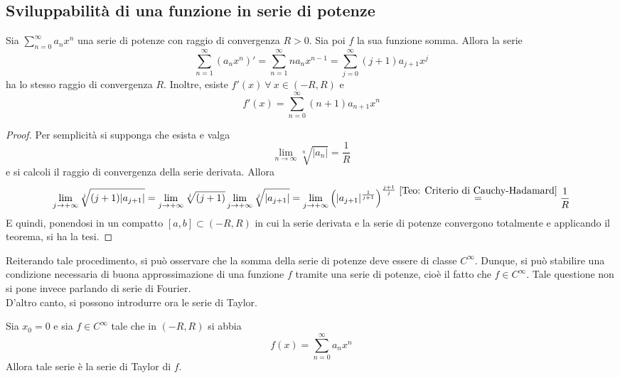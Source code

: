 \subsection{Sviluppabilità di una funzione in serie di potenze}
\begin{theorem} \label{Teo: Derivazione di serie di potenze}
Sia $\sum\limits_{n=0}^{\infty}{a_n x^n}$ una serie di potenze con raggio di convergenza $R>0$. Sia poi $f$ la sua funzione somma. Allora la serie
\begin{equation*}
    \sum\limits_{n=1}^{\infty}{\left(a_n x^n\right)'}= \sum\limits_{n=1}^{\infty}{n a_n x^{n-1}}= \sum\limits_{j=0}^{\infty}{\left(j+1\right)a_{j+1} x^j}
\end{equation*}
ha lo stesso raggio di convergenza $R$. Inoltre, esiste $f'(x)\ \forall\ x \in (-R, R)$ e
\begin{equation*}
    f'(x)=\sum\limits_{n=0}^{\infty}{\left(n+1\right)a_{n+1} x^n}
\end{equation*}
\end{theorem}
\begin{proof}
    Per semplicità si supponga che esista e valga 
    \begin{equation*}
        \lim_{n \to \infty}{\sqrt[n]{|a_n|}}=\frac{1}{R}
    \end{equation*}
    e si calcoli il raggio di convergenza della serie derivata. Allora
    \begin{equation*}
        \lim_{j \to + \infty}{\sqrt[j]{(j+1)|a_{j+1}|}} = \lim_{j \to + \infty}{\sqrt[j]{(j+1)}} \lim_{j \to + \infty}{\sqrt[j]{|a_{j+1}|}}= \lim_{j \to + \infty}{{\left(|a_{j+1}|^{\frac{1}{j+1}}\right)^{\frac{j+1}{j}}}}  \overset{\ref{Teo: Criterio di Cauchy-Hadamard}}{=} \frac{1}{R}
    \end{equation*}
    E quindi, ponendosi in un compatto $[a,b] \subset (-R, R)$ in cui la serie derivata e la serie di potenze convergono totalmente e applicando il teorema, si ha la tesi.
\end{proof}
Reiterando tale procedimento, si può osservare che la somma della serie di potenze deve essere di classe $C^\infty$. Dunque, si può stabilire una condizione necessaria di buona approssimazione di una funzione $f$ tramite una serie di potenze, cioè il fatto che $f \in C^{\infty}$. Tale questione non si pone invece parlando di serie di Fourier.\\
D'altro canto, si possono introdurre ora le serie di Taylor. 
\begin{proposition}
Sia $x_0=0$ e sia $f \in C^\infty$ tale che in $(-R, R)$ si abbia
\begin{equation*}
    f(x)= \sum\limits_{n=0}^{\infty}{a_n x^n}
\end{equation*}
Allora tale serie è la serie di Taylor di $f$.
\end{proposition}
